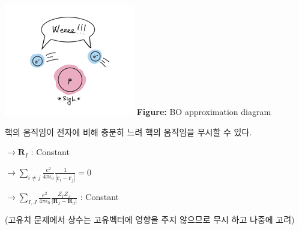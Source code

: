 \documentclass[10pt]{article}
\begin{document}
\begin{enumerate}[label=3)]
\begin{enumerate}[label=\(\mathrm{i}\))]
\begin{tcolorbox}[enhanced, breakable, colback=gray!10, colframe=black, title=Definition: Born-oppenheimer Approximation]
\begin{minipage}[t]{0.48\textwidth}
  \vspace*{0pt} %
  \centering
  \includegraphics[width=\linewidth]{fig/BOapprox.png}
  \vspace{6pt}
  \textbf{Figure:} BO approximation diagram
\end{minipage}
\hfill
\begin{minipage}[t]{0.48\textwidth}
  \vspace*{10pt} %
  핵의 움직임이 전자에 비해 충분히 느려 핵의 움직임을 무시할 수 있다. 

\vspace*{8pt}

\(\rightarrow \mathbf{R}_I\) : Constant

\vspace{\baselineskip}

\(\rightarrow \sum_{i \ne j} \frac{e^2}{4 \pi \epsilon_0} \frac{1}{|\mathbf{r}_i - \mathbf{r}_j|} = 0\) 

\vspace{\baselineskip}

\(\rightarrow \sum_{I,J} \frac{e^2}{4 \pi \epsilon_0} \frac{Z_I Z_J}{|\mathbf{R}_I - \mathbf{R}_J|}\) : Constant

\vspace*{5pt}

(고유치 문제에서 상수는 고유벡터에 영향을 주지 않으므로 무시 하고 나중에 고려)


\end{minipage}
\end{tcolorbox}
\end{enumerate}
\end{enumerate}
\end{document}
